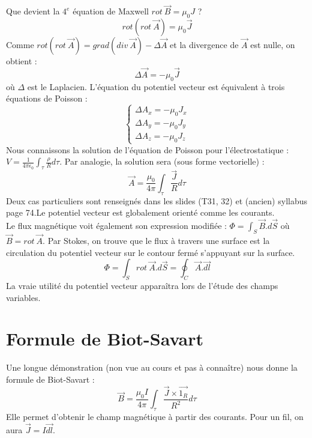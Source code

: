 \documentclass	[11pt, a4paper, openany]{book}
\begin{document}
Que devient la $4^e$ équation de Maxwell $rot\ \vec{B} = \mu_0J$ ?
\begin{equation}
rot(rot\ \vec{A}) = \mu_0\vec{J}
\end{equation}
Comme $rot(rot\ \vec{A}) = grad(div\ \vec{A})-\Delta \vec{A}$ et la divergence de $\vec{A}$ est nulle, on obtient :
\begin{equation}
\Delta \vec{A} = -\mu_0\vec{J}
\end{equation}
où $\Delta$ est le Laplacien. L'équation du potentiel vecteur est équivalent à trois équations de Poisson :
\begin{equation}
\left\{\begin{array}{l}
\Delta A_x = -\mu_0J_x\\
\Delta A_y = -\mu_0J_y\\
\Delta A_z = -\mu_0J_z
\end{array}\right.
\end{equation}
Nous connaissons la solution de l'équation de Poisson pour l'électrostatique : $V = \frac{1}{4\pi\epsilon_0}\int_\tau \frac{\rho}{R}d\tau$. Par analogie, la solution sera (sous forme vectorielle) :
\begin{equation}
\vec{A} = \frac{\mu_0}{4\pi}\int_\tau\frac{\vec{J}}{R}d\tau
\end{equation}
Deux cas particuliers sont renseignés dans les slides (T31, 32) et (ancien) syllabus page 74.Le potentiel vecteur est globalement orienté comme les courants.\\

Le flux magnétique voit également son expression modifiée : $\Phi = \int_S \vec{B}.d\vec{S}$ où $\vec{B} = rot\ \vec{A}$. Par Stokes, on trouve que le flux à travers une surface est la circulation du potentiel vecteur sur le contour fermé s'appuyant sur la surface.
\begin{equation}
\Phi = \int_S rot\ \vec{A}.d\vec{S} = \oint_C \vec{A}.\vec{dl}
\end{equation}
La vraie utilité du potentiel vecteur apparaîtra lors de l'étude des champs variables.


\section{Formule de Biot-Savart}
Une longue démonstration (non vue au cours et pas à connaître) nous donne la formule de Biot-Savart :
\begin{equation}
\vec{B} = \dfrac{\mu_0I}{4\pi}\int_\tau \dfrac{\vec{J}\times\vec{1_R}}{R^2}d\tau
\end{equation}
Elle permet d'obtenir le champ magnétique à partir des courants. Pour un fil, on aura $\vec{J} = I\vec{dl}$.
\end{document}
